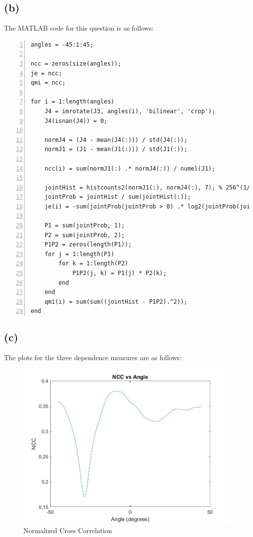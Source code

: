 \documentclass{article}
\begin{document}
\newpage
\subsection*{(b)}

The MATLAB code for this question is as follows:
\begin{lstlisting}[frame=single,numbers=left,style=Matlab-Pyglike,breaklines=true,postbreak=\mbox{\textcolor{red}{$\hookrightarrow$}\space}]
angles = -45:1:45;

ncc = zeros(size(angles));
je = ncc;
qmi = ncc;

for i = 1:length(angles)
    J4 = imrotate(J3, angles(i), 'bilinear', 'crop');
    J4(isnan(J4)) = 0;
    
    normJ4 = (J4 - mean(J4(:))) / std(J4(:));
    normJ1 = (J1 - mean(J1(:))) / std(J1(:));
    
    ncc(i) = sum(normJ1(:) .* normJ4(:)) / numel(J1);
    
    jointHist = histcounts2(normJ1(:), normJ4(:), 7); % 256^(1/3) bins approximately
    jointProb = jointHist / sum(jointHist(:));
    je(i) = -sum(jointProb(jointProb > 0) .* log2(jointProb(jointProb > 0)));
    
    P1 = sum(jointProb, 1);
    P2 = sum(jointProb, 2);
    P1P2 = zeros(length(P1));
    for j = 1:length(P1)
        for k = 1:length(P2)
            P1P2(j, k) = P1(j) * P2(k);
        end
    end
    qmi(i) = sum(sum((jointHist - P1P2).^2));
end
\end{lstlisting}

\newpage
\subsection*{(c)}

The plots for the three dependence measures are as follows:
\begin{figure}[H]
\centering
\includegraphics[scale=0.3]{NCC_vs_Angle.jpg}
\caption{Normalized Cross Correlation}
\end{figure}
\end{document}
